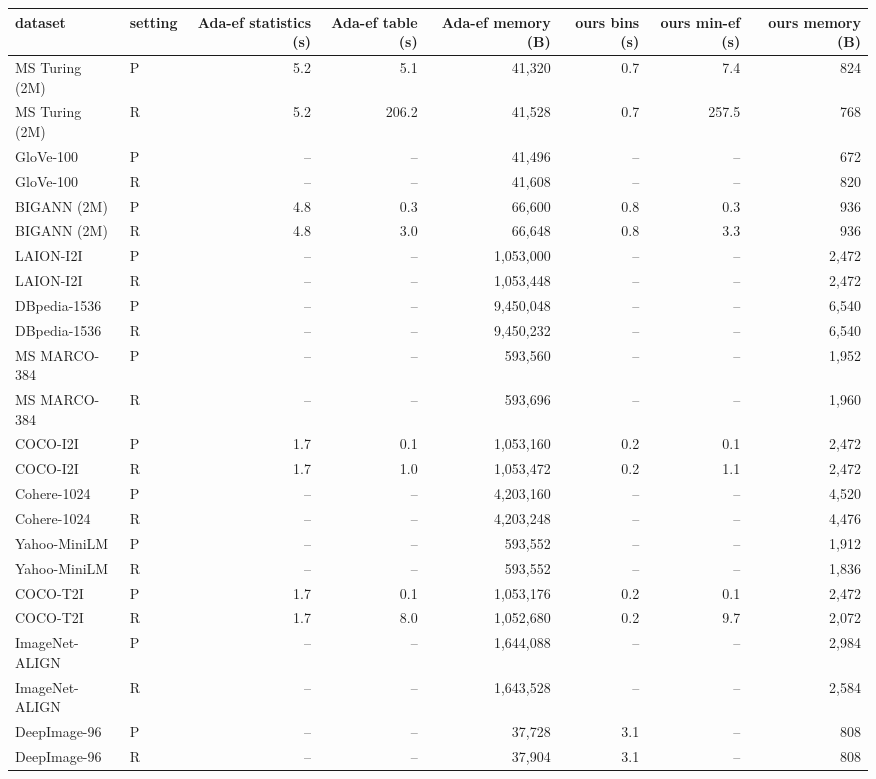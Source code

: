 \begin{tabular}{llrrrrrr}
\toprule
dataset & setting & Ada-ef statistics (s) & Ada-ef table (s) & Ada-ef memory (B) & ours bins (s) & ours min-ef (s) & ours memory (B) \\
\midrule
MS Turing (2M) & P & 5.2 & 5.1 & 41,320 & 0.7 & 7.4 & 824 \\
MS Turing (2M) & R & 5.2 & 206.2 & 41,528 & 0.7 & 257.5 & 768 \\
GloVe-100 & P & -- & -- & 41,496 & -- & -- & 672 \\
GloVe-100 & R & -- & -- & 41,608 & -- & -- & 820 \\
BIGANN (2M) & P & 4.8 & 0.3 & 66,600 & 0.8 & 0.3 & 936 \\
BIGANN (2M) & R & 4.8 & 3.0 & 66,648 & 0.8 & 3.3 & 936 \\
LAION-I2I & P & -- & -- & 1,053,000 & -- & -- & 2,472 \\
LAION-I2I & R & -- & -- & 1,053,448 & -- & -- & 2,472 \\
DBpedia-1536 & P & -- & -- & 9,450,048 & -- & -- & 6,540 \\
DBpedia-1536 & R & -- & -- & 9,450,232 & -- & -- & 6,540 \\
MS MARCO-384 & P & -- & -- & 593,560 & -- & -- & 1,952 \\
MS MARCO-384 & R & -- & -- & 593,696 & -- & -- & 1,960 \\
COCO-I2I & P & 1.7 & 0.1 & 1,053,160 & 0.2 & 0.1 & 2,472 \\
COCO-I2I & R & 1.7 & 1.0 & 1,053,472 & 0.2 & 1.1 & 2,472 \\
Cohere-1024 & P & -- & -- & 4,203,160 & -- & -- & 4,520 \\
Cohere-1024 & R & -- & -- & 4,203,248 & -- & -- & 4,476 \\
Yahoo-MiniLM & P & -- & -- & 593,552 & -- & -- & 1,912 \\
Yahoo-MiniLM & R & -- & -- & 593,552 & -- & -- & 1,836 \\
COCO-T2I & P & 1.7 & 0.1 & 1,053,176 & 0.2 & 0.1 & 2,472 \\
COCO-T2I & R & 1.7 & 8.0 & 1,052,680 & 0.2 & 9.7 & 2,072 \\
ImageNet-ALIGN & P & -- & -- & 1,644,088 & -- & -- & 2,984 \\
ImageNet-ALIGN & R & -- & -- & 1,643,528 & -- & -- & 2,584 \\
DeepImage-96 & P & -- & -- & 37,728 & 3.1 & -- & 808 \\
DeepImage-96 & R & -- & -- & 37,904 & 3.1 & -- & 808 \\

\end{tabular}
